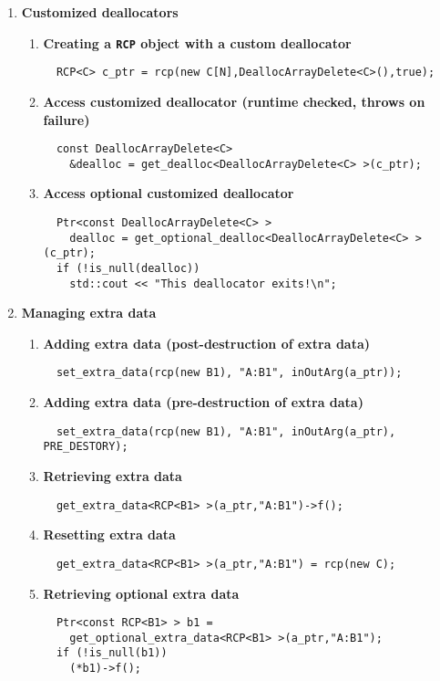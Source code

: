 \documentclass[pdf,ps2pdf,11pt]{SANDreport}
\begin{document}
\begin{enumerate}
\item {\bf Customized deallocators}
\label{rcpqs:apdx:qs:dealloc}
%
\begin{enumerate}
%
\item {\bf Creating a \texttt{RCP} object with a custom deallocator }
%
{\small\begin{verbatim}
  RCP<C> c_ptr = rcp(new C[N],DeallocArrayDelete<C>(),true);
\end{verbatim}}
%
\item {\bf Access customized deallocator (runtime checked, throws on failure)}
%
{\small\begin{verbatim}
  const DeallocArrayDelete<C>
    &dealloc = get_dealloc<DeallocArrayDelete<C> >(c_ptr);
\end{verbatim}}
%
\item {\bf Access optional customized deallocator}
%
{\small\begin{verbatim}
  Ptr<const DeallocArrayDelete<C> >
    dealloc = get_optional_dealloc<DeallocArrayDelete<C> >(c_ptr);
  if (!is_null(dealloc))
    std::cout << "This deallocator exits!\n";
\end{verbatim}}
%
\end{enumerate}

\item {\bf Managing extra data}
\label{rcpqs:apdx:qs:extra-data}
%
\begin{enumerate}
%
\item {\bf Adding extra data (post-destruction of extra data)}
%
{\small\begin{verbatim}
  set_extra_data(rcp(new B1), "A:B1", inOutArg(a_ptr));
\end{verbatim}}
%
\item {\bf Adding extra data (pre-destruction of extra data)}
%
{\small\begin{verbatim}
  set_extra_data(rcp(new B1), "A:B1", inOutArg(a_ptr), PRE_DESTORY);
\end{verbatim}}
%
\item {\bf Retrieving extra data}
%
{\small\begin{verbatim}
  get_extra_data<RCP<B1> >(a_ptr,"A:B1")->f();
\end{verbatim}}
%
\item {\bf Resetting extra data}
%
{\small\begin{verbatim}
  get_extra_data<RCP<B1> >(a_ptr,"A:B1") = rcp(new C);
\end{verbatim}}
%
\item {\bf Retrieving optional extra data}
%
{\small\begin{verbatim}
  Ptr<const RCP<B1> > b1 =
    get_optional_extra_data<RCP<B1> >(a_ptr,"A:B1");
  if (!is_null(b1))
    (*b1)->f();
\end{verbatim}}
%
\end{enumerate}


\end{enumerate}
\end{document}
